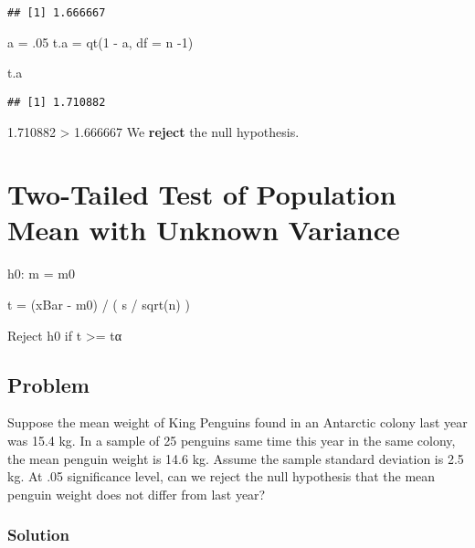 \documentclass[
]{article}
\newenvironment{Shaded}{\begin{snugshade}}{\end{snugshade}}
\newcommand{\AttributeTok}[1]{\textcolor[rgb]{0.77,0.63,0.00}{#1}}
\newcommand{\DecValTok}[1]{\textcolor[rgb]{0.00,0.00,0.81}{#1}}
\newcommand{\FunctionTok}[1]{\textcolor[rgb]{0.00,0.00,0.00}{#1}}
\newcommand{\NormalTok}[1]{#1}
\newcommand{\OtherTok}[1]{\textcolor[rgb]{0.56,0.35,0.01}{#1}}
\newcommand{\SpecialCharTok}[1]{\textcolor[rgb]{0.00,0.00,0.00}{#1}}
\begin{document}
\begin{verbatim}
## [1] 1.666667
\end{verbatim}

\begin{Shaded}
\begin{Highlighting}[]
\NormalTok{a }\OtherTok{=}\NormalTok{ .}\DecValTok{05}
\NormalTok{t.a }\OtherTok{=} \FunctionTok{qt}\NormalTok{(}\DecValTok{1} \SpecialCharTok{{-}}\NormalTok{ a, }\AttributeTok{df =}\NormalTok{ n }\SpecialCharTok{{-}}\DecValTok{1}\NormalTok{)}

\NormalTok{t.a}
\end{Highlighting}
\end{Shaded}

\begin{verbatim}
## [1] 1.710882
\end{verbatim}

1.710882 \textgreater{} 1.666667 We \textbf{reject} the null hypothesis.

\hypertarget{two-tailed-test-of-population-mean-with-unknown-variance}{%
\section{Two-Tailed Test of Population Mean with Unknown
Variance}\label{two-tailed-test-of-population-mean-with-unknown-variance}}

h0: m = m0

t = (xBar - m0) / ( s / sqrt(n) )

Reject h0 if t \textgreater= \textbar{} tα \textbar{}

\hypertarget{problem-15}{%
\subsection{Problem}\label{problem-15}}

Suppose the mean weight of King Penguins found in an Antarctic colony
last year was 15.4 kg. In a sample of 25 penguins same time this year in
the same colony, the mean penguin weight is 14.6 kg. Assume the sample
standard deviation is 2.5 kg. At .05 significance level, can we reject
the null hypothesis that the mean penguin weight does not differ from
last year?

\hypertarget{solution-17}{%
\subsubsection{Solution}\label{solution-17}}
\end{document}
